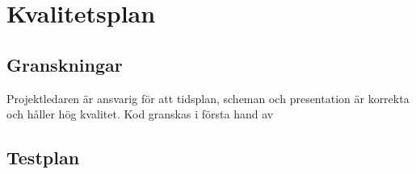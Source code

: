 \section{Kvalitetsplan}

\subsection{Granskningar}
Projektledaren är ansvarig för att tidsplan, scheman och presentation är korrekta och håller hög kvalitet. Kod granskas i första hand av 

\subsection{Testplan}
